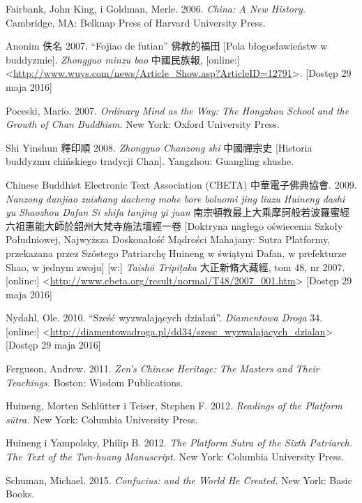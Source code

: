 Fairbank, John King, i Goldman, Merle. 2006. \textit{China: A New History.} Cambridge, MA: Belknap Press of Harvard University Press.

Anonim 佚名 2007. ``Fojiao de futian'' 佛教的福田 [Pola błogosławieństw w buddyzmie]. \textit{Zhongguo minzu bao} 中國民族報, [online:] <\url{http://www.wuys.com/news/Article_Show.asp?ArticleID=12791}>. [Dostęp 29 maja 2016]

Poceski, Mario. 2007. \textit{Ordinary Mind as the Way: The Hongzhou School and the Growth of Chan Buddhism.} New York: Oxford University Press.

Shi Yinshun 釋印順 2008. \textit{Zhongguo Chanzong shi} 中國禪宗史 [Historia buddyzmu chińskiego tradycji Chan]. Yangzhou: Guangling shushe.

Chinese Buddhist Electronic Text Association (CBETA) 中華電子佛典協會. 2009. \textit{Nanzong dunjiao zuishang dacheng mohe bore boluomi jing liuzu Huineng dashi yu Shaozhou Dafan Si shifa tanjing yi juan} 南宗頓教最上大乘摩訶般若波羅蜜經六祖惠能大師於韶州大梵寺施法壇經一卷 [Doktryna nagłego oświecenia Szkoły Południowej, Najwyższa Doskonałość Mądrości Mahajany: Sutra Platformy, przekazana przez Szóstego Patriarchę Huineng w świątyni Dafan, w prefekturze Shao, w jednym zwoju] [w:] \textit{Taishō Tripi\d{t}aka} 大正新脩大藏經, tom 48, nr 2007. [online:] <\url{http://www.cbeta.org/result/normal/T48/2007_001.htm}> [Dostęp 29 maja 2016]

Nydahl, Ole. 2010. ``Sześć wyzwalających działań''. \textit{Diamentowa Droga} 34. [online:] <\url{http://diamentowadroga.pl/dd34/szesc_wyzwalajacych_dzialan}> [Dostęp 29 maja 2016]

Ferguson, Andrew. 2011. \textit{Zen's Chinese Heritage: The Masters and Their Teachings.} Boston: Wisdom Publications.

Huineng, Morten Schlütter i Teiser, Stephen F. 2012. \textit{Readings of the Platform sūtra.} New York: Columbia University Press.

Huineng i Yampolsky, Philip B. 2012. \textit{The Platform Sutra of the Sixth Patriarch. The Text of the Tun-huang Manuscript.} New York: Columbia University Press.

Schuman, Michael. 2015. \textit{Confucius: and the World He Created.} New York: Basic Books.
